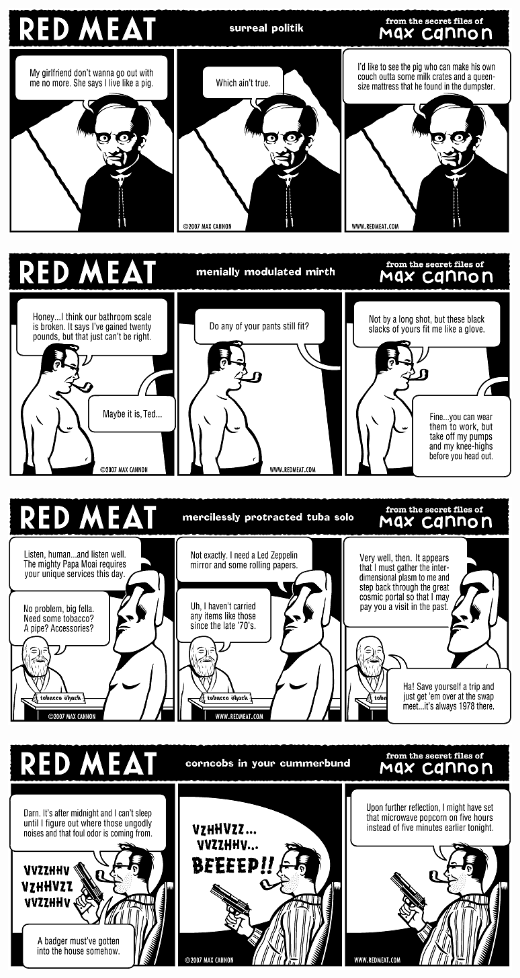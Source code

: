 \documentclass[a4paper,twoside,11pt]{article}
\begin{document}
\includegraphics[width=\textwidth]{redmeat_2007-02-13.png}



\includegraphics[width=\textwidth]{redmeat_2007-02-20.png}



\includegraphics[width=\textwidth]{redmeat_2007-02-27.png}



\includegraphics[width=\textwidth]{redmeat_2007-03-06.png}
\end{document}
